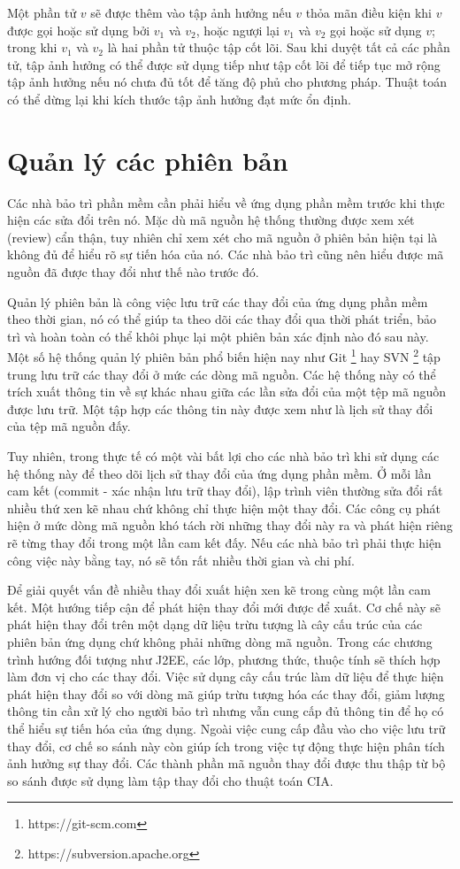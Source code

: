 \documentclass[12pt]{report}
\begin{document}
Một phần tử $v$ sẽ được thêm vào tập ảnh hưởng nếu $v$ thỏa mãn điều kiện khi $v$ được gọi hoặc sử dụng bởi $v_1$ và $v_2$, hoặc ngượi lại $v_1$ và $v_2$ gọi hoặc sử dụng $v$; trong khi $v_1$ và $v_2$ là hai phần tử thuộc tập cốt lõi. Sau khi duyệt tất cả các phần tử, tập ảnh hưởng có thể được sử dụng tiếp như tập cốt lõi để tiếp tục mở rộng tập ảnh hưởng nếu nó chưa đủ tốt để tăng độ phủ cho phương pháp. Thuật toán có thể dừng lại khi kích thước tập ảnh hưởng đạt mức ổn định.

\chapter{Quản lý các phiên bản}
Các nhà bảo trì phần mềm cần phải hiểu về ứng dụng phần mềm trước khi thực hiện các sửa đổi trên nó. Mặc dù mã nguồn hệ thống thường được xem xét (review) cẩn thận, tuy nhiên chỉ xem xét cho mã nguồn ở phiên bản hiện tại là không đủ để hiểu rõ sự tiến hóa của nó. Các nhà bảo trì cũng nên hiểu được mã nguồn đã được thay đổi như thế nào trước đó.

Quản lý phiên bản là công việc lưu trữ các thay đổi của ứng dụng phần mềm theo thời gian, nó có thể giúp ta theo dõi các thay đổi qua thời phát triển, bảo trì và hoàn toàn có thể khôi phục lại một phiên bản xác định nào đó sau này. Một số hệ thống quản lý phiên bản phổ biến hiện nay như Git \footnote{https://git-scm.com} hay SVN  \footnote{https://subversion.apache.org} tập trung lưu trữ các thay đổi ở mức các dòng mã nguồn. Các hệ thống này có thể trích xuất thông tin về sự khác nhau giữa các lần sửa đổi của một tệp mã nguồn được lưu trữ. Một tập hợp các thông tin này được xem như là lịch sử thay đổi của tệp mã nguồn đấy.

Tuy nhiên, trong thực tế có một vài bất lợi cho các nhà bảo trì khi sử dụng các hệ thống này để theo dõi lịch sử thay đổi của ứng dụng phần mềm. Ở mỗi lần cam kết (commit - xác nhận lưu trữ thay đổi), lập trình viên thường sửa đổi rất nhiều thứ xen kẽ nhau chứ không chỉ thực hiện một thay đổi. Các công cụ phát hiện ở mức dòng mã nguồn khó tách rời những thay đổi này ra và phát hiện riêng rẽ từng thay đổi trong một lần cam kết đấy. Nếu các nhà bảo trì phải thực hiện công việc này bằng tay, nó sẽ tốn rất nhiều thời gian và chi phí.

Để giải quyết vấn đề nhiều thay đổi xuất hiện xen kẽ trong cùng một lần cam kết. Một hướng tiếp cận để phát hiện thay đổi mới được để xuất. Cơ chế này sẽ phát hiện thay đổi trên một dạng dữ liệu trừu tượng là cây cấu trúc của các phiên bản ứng dụng chứ không phải những dòng mã nguồn. Trong các chương trình hướng đối tượng như J2EE, các lớp, phương thức, thuộc tính sẽ thích hợp làm đơn vị cho các thay đổi. Việc sử dụng cây cấu trúc làm dữ liệu để thực hiện phát hiện thay đổi so với dòng mã giúp trừu tượng hóa các thay đổi, giảm lượng thông tin cần xử lý cho người bảo trì nhưng vẫn cung cấp đủ thông tin để họ có thể hiểu sự tiến hóa của ứng dụng. Ngoài việc cung cấp đầu vào cho việc lưu trữ thay đổi, cơ chế so sánh này còn giúp ích trong việc tự động thực hiện phân tích ảnh hưởng sự thay đổi. Các thành phần mã nguồn thay đổi được thu thập từ bộ so sánh được sử dụng làm tập thay đổi cho thuật toán CIA.
\end{document}
